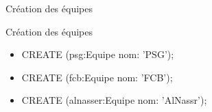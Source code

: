\begin{frame}{Création des équipes}
  \begin{block}{Création des équipes}
    \begin{itemize}
      \item CREATE (psg:Equipe {nom: 'PSG'});
      \item CREATE (fcb:Equipe {nom: 'FCB'});
      \item CREATE (alnasser:Equipe {nom: 'AlNassr'});
    \end{itemize}
  \end{block}
\end{frame}